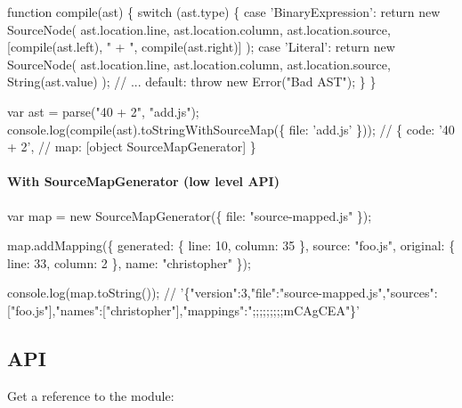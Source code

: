 \begin{DoxyCode}
\textcolor{keyword}{function} compile(ast) \{
  \textcolor{keywordflow}{switch} (ast.type) \{
  \textcolor{keywordflow}{case} \textcolor{stringliteral}{'BinaryExpression'}:
    \textcolor{keywordflow}{return} \textcolor{keyword}{new} SourceNode(
      ast.location.line,
      ast.location.column,
      ast.location.source,
      [compile(ast.left), \textcolor{stringliteral}{" + "}, compile(ast.right)]
    );
  \textcolor{keywordflow}{case} \textcolor{stringliteral}{'Literal'}:
    \textcolor{keywordflow}{return} \textcolor{keyword}{new} SourceNode(
      ast.location.line,
      ast.location.column,
      ast.location.source,
      String(ast.value)
    );
  \textcolor{comment}{// ...}
  \textcolor{keywordflow}{default}:
    \textcolor{keywordflow}{throw} \textcolor{keyword}{new} Error(\textcolor{stringliteral}{"Bad AST"});
  \}
\}

var ast = parse(\textcolor{stringliteral}{"40 + 2"}, \textcolor{stringliteral}{"add.js"});
console.log(compile(ast).toStringWithSourceMap(\{
  file: \textcolor{stringliteral}{'add.js'}
\}));
\textcolor{comment}{// \{ code: '40 + 2',}
\textcolor{comment}{//   map: [object SourceMapGenerator] \}}
\end{DoxyCode}


\paragraph*{With Source\+Map\+Generator (low level A\+P\+I)}


\begin{DoxyCode}
var map = \textcolor{keyword}{new} SourceMapGenerator(\{
  file: \textcolor{stringliteral}{"source-mapped.js"}
\});

map.addMapping(\{
  generated: \{
    line: 10,
    column: 35
  \},
  source: \textcolor{stringliteral}{"foo.js"},
  original: \{
    line: 33,
    column: 2
  \},
  name: \textcolor{stringliteral}{"christopher"}
\});

console.log(map.toString());
\textcolor{comment}{//
       '\{"version":3,"file":"source-mapped.js","sources":["foo.js"],"names":["christopher"],"mappings":";;;;;;;;;mCAgCEA"\}'}
\end{DoxyCode}


\subsection*{A\+P\+I}

Get a reference to the module\+:


